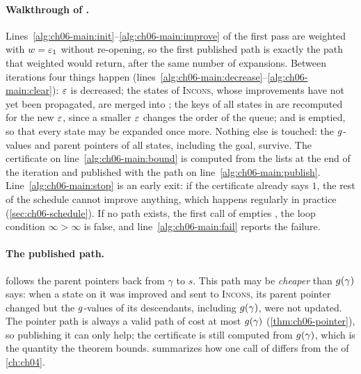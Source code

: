 \paragraph{Walkthrough of .}
Lines~\ref{alg:ch06-main:init}--\ref{alg:ch06-main:improve} of the first pass
are weighted \astar with $w = \varepsilon_1$ without re-opening, so the first
published path is exactly the path that weighted \astar would return, after
the same number of expansions. Between iterations four things happen
(lines~\ref{alg:ch06-main:decrease}--\ref{alg:ch06-main:clear}): $\varepsilon$ is
decreased; the states of \textsc{Incons}, whose improvements have not yet been
propagated, are merged into \Open; the keys of all states in \Open are
recomputed for the new $\varepsilon$, since a smaller $\varepsilon$ changes the order of the
queue; and \Closed is emptied, so that every state may be expanded once more.
Nothing else is touched: the $g$-values and parent pointers of all
states, including the goal, survive. The certificate on
line~\ref{alg:ch06-main:bound} is computed from the lists at the end of the
iteration and published with the path on line~\ref{alg:ch06-main:publish}.
Line~\ref{alg:ch06-main:stop} is an early exit: if the certificate already
says $1$, the rest of the schedule cannot improve anything, which happens
regularly in practice (\cref{sec:ch06-schedule}). If no path exists, the
first call of \AraImprovePath empties \Open, the loop condition
$\infty > \infty$ is false, and line~\ref{alg:ch06-main:fail} reports the
failure.

\paragraph{The published path.}
\AraPath follows the parent pointers back from $\gamma$ to $s$. This path may
be \emph{cheaper} than $g(\gamma)$ says: when a state on it was improved
and sent to \textsc{Incons}, its parent pointer changed but the
$g$-values of its descendants, including $g(\gamma)$, were not
updated. The pointer path is always a valid path of cost at most
$g(\gamma)$ (\cref{thm:ch06-pointer}), so publishing it can only help;
the certificate is still computed from $g(\gamma)$, which is the quantity
the theorem bounds.  summarizes how one call of
\AraImprovePath differs from the \astar of \cref{ch:ch04}.

